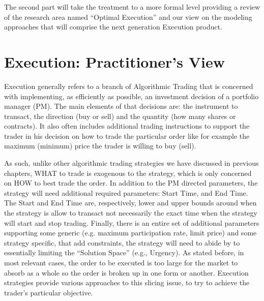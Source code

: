 The second part will take the treatment to a more formal level providing a review of  the research area named ``Optimal Execution'' and our view on the modeling approaches that will comprise the next generation Execution product.



\section{Execution: Practitioner's View}

Execution generally refers to a branch of Algorithmic Trading that is concerned with  implementing, as efficiently as possible, an investment decision of a portfolio manager (PM). The main elements of that decisions are: the instrument to transact, the direction (buy or sell) and the quantity (how many shares or contracts). It also often includes additional trading instructions to support the trader in his decision on how to trade the particular order like for example the maximum (minimum) price the trader is willing to buy (sell). 


As such, unlike other algorithmic trading strategies we have discussed in previous chapters, WHAT to trade is exogenous to the strategy, which is only concerned on HOW to best trade the order. In addition to the PM directed parameters, the strategy will need additional  required parameters: Start Time, and End Time. The Start and End Time are, respectively, lower and upper bounds around when the strategy is allow to transact not necessarily the exact time when the strategy will start and stop trading. Finally, there is an entire set of additional parameters supporting some generic (e.g. maximum participation rate, limit price) and some strategy specific, that add constraints, the strategy will need to abide by to essentially limiting the ``Solution Space'' (e.g., Urgency). As stated before, in most relevant cases, the order to be executed is too large for the market to absorb as a whole so the order is broken up in one form or another. Execution strategies provide various approaches to this slicing issue, to try to achieve the trader's particular objective.


